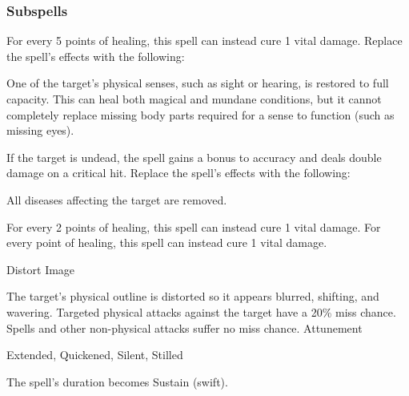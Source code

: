 \subsubsection{Subspells}
For every 5 points of healing, this spell can instead cure 1 vital damage.
Replace the spell's effects with the following:
\begin{spellcontent}
\begin{augmenteffects}
\spelleffect
One of the target's physical senses, such as sight or hearing, is restored to full capacity.
This can heal both magical and mundane conditions, but it cannot completely replace missing body parts required for a sense to function (such as missing eyes).
\end{augmenteffects}
\end{spellcontent}
If the target is undead, the spell gains a  bonus to accuracy and deals double damage on a critical hit.
Replace the spell's effects with the following:
\begin{spellcontent}
\begin{augmenteffects}
\spelleffect
All diseases affecting the target are removed.
\end{augmenteffects}
\end{spellcontent}
For every 2 points of healing, this spell can instead cure 1 vital damage.
For every point of healing, this spell can instead cure 1 vital damage.
\begin{spellsection}{Distort Image}
\begin{spellcontent}
\begin{spelltargetinginfo}
\end{spelltargetinginfo}
\begin{spelleffects}
\spelleffect
The target's physical outline is distorted so it appears blurred, shifting, and wavering.
Targeted physical attacks against the target have a 20\% miss chance.
Spells and other non-physical attacks suffer no miss chance.
\spelldur Attunement
\end{spelleffects}
\end{spellcontent}
\begin{spellfooter}
 Extended, Quickened, Silent, Stilled
\end{spellfooter}
\begin{spellsubcontent}
\begin{spellcantrip}
The spell's duration becomes Sustain (swift).
\end{spellcantrip}
\end{spellsubcontent}
\end{spellsection}

